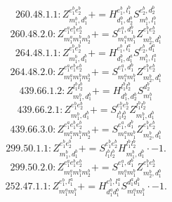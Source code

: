 \documentclass[letterpaper,10pt,fleqn,leqno,onecolumn]{article}
\begin{document}
\begin{equation} \;\;\;\;\;\;  260.48.1.1: Z^{e_{1}^{b}e_{2}^{b}}_{m_{1}^{b},d_{1}^{b}}+=H^{e_{1}^{b},l_{1}^{b}}_{d_{1}^{b},d_{2}^{b}}S^{e_{2}^{b},d_{2}^{b}}_{m_{1}^{b},l_{1}^{b}} \end{equation}
\begin{equation} \;\;\;\;\;\;  260.48.2.0: Z^{e_{1}^{a}e_{1}^{b}e_{2}^{b}}_{m_{1}^{a}m_{1}^{b}m_{2}^{b}}+=S^{e_{1}^{a},d_{1}^{b}}_{m_{1}^{a}m_{1}^{b}}Z^{e_{1}^{b}e_{2}^{b}}_{m_{2}^{b},d_{1}^{b}} \end{equation}
\begin{equation} \;\;\;\;\;\;  264.48.1.1: Z^{e_{1}^{b}e_{2}^{b}}_{m_{1}^{b},d_{1}^{b}}+=H^{e_{1}^{b},l_{1}^{a}}_{d_{1}^{b},d_{1}^{a}}S^{e_{2}^{b},d_{1}^{a}}_{m_{1}^{b},l_{1}^{a}} \end{equation}
\begin{equation} \;\;\;\;\;\;  264.48.2.0: Z^{e_{1}^{a}e_{1}^{b}e_{2}^{b}}_{m_{1}^{a}m_{1}^{b}m_{2}^{b}}+=S^{e_{1}^{a},d_{1}^{b}}_{m_{1}^{a}m_{1}^{b}}Z^{e_{1}^{b}e_{2}^{b}}_{m_{2}^{b},d_{1}^{b}} \end{equation}
\begin{equation} \;\;\;\;\;\;  439.66.1.2: Z^{l_{1}^{b}l_{2}^{b}}_{m_{1}^{b},d_{1}^{b}}+=H^{l_{1}^{b}l_{2}^{b}}_{d_{1}^{b},d_{2}^{b}}S^{d_{2}^{b}}_{m_{1}^{b}} \end{equation}
\begin{equation} \;\;\;\;\;\;  439.66.2.1: Z^{e_{1}^{b}e_{2}^{b}}_{m_{1}^{b},d_{1}^{b}}+=S^{e_{1}^{b}e_{2}^{b}}_{l_{1}^{b}l_{2}^{b}}Z^{l_{1}^{b}l_{2}^{b}}_{m_{1}^{b},d_{1}^{b}} \end{equation}
\begin{equation} \;\;\;\;\;\;  439.66.3.0: Z^{e_{1}^{a}e_{1}^{b}e_{2}^{b}}_{m_{1}^{a}m_{1}^{b}m_{2}^{b}}+=S^{e_{1}^{a},d_{1}^{b}}_{m_{1}^{a}m_{1}^{b}}Z^{e_{1}^{b}e_{2}^{b}}_{m_{2}^{b},d_{1}^{b}} \end{equation}
\begin{equation} \;\;\;\;\;\;  299.50.1.1: Z^{e_{1}^{b}e_{2}^{b}}_{m_{1}^{b},d_{1}^{b}}+=S^{e_{1}^{b}e_{2}^{b}}_{l_{1}^{b}l_{2}^{b}}H^{l_{1}^{b}l_{2}^{b}}_{m_{1}^{b},d_{1}^{b}}\cdot -1. \end{equation}
\begin{equation} \;\;\;\;\;\;  299.50.2.0: Z^{e_{1}^{a}e_{1}^{b}e_{2}^{b}}_{m_{1}^{a}m_{1}^{b}m_{2}^{b}}+=S^{e_{1}^{a},d_{1}^{b}}_{m_{1}^{a}m_{1}^{b}}Z^{e_{1}^{b}e_{2}^{b}}_{m_{2}^{b},d_{1}^{b}} \end{equation}
\begin{equation} \;\;\;\;\;\;  252.47.1.1: Z^{e_{1}^{b},l_{1}^{a}}_{m_{1}^{a}m_{1}^{b}}+=H^{e_{1}^{b},l_{1}^{a}}_{d_{1}^{a}d_{1}^{b}}S^{d_{1}^{a}d_{1}^{b}}_{m_{1}^{a}m_{1}^{b}}\cdot -1. \end{equation}
\end{document}
